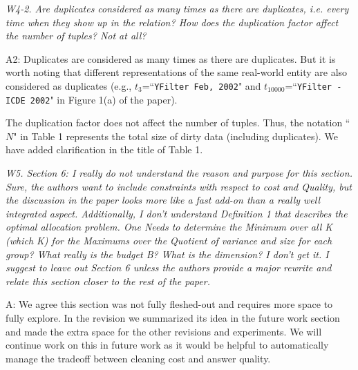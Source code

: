 


\vspace{1em}
 

\emph{W4-2. Are duplicates considered as many times as there are duplicates, i.e. every time when they show up in the relation? How does the duplication factor affect the number of tuples? Not at all?}


A2: Duplicates are considered as many times as there are duplicates. But it is worth noting that different representations of the same real-world entity are also considered as duplicates (e.g., $t_3$=``\texttt{YFilter Feb, 2002}" and $t_{10000}$=``\texttt{YFilter - ICDE 2002}" in Figure 1(a) of the paper). 

The duplication factor does not affect the number of tuples. Thus, the notation ``$N$" in Table 1 represents the total size of dirty data (including duplicates). We have added clarification in the title of Table 1.


\mbox{}

\emph{W5. Section 6: I really do not understand the reason and purpose for this section. Sure, the authors want to include constraints with respect to cost and Quality, but the discussion in the paper looks more like a fast add-on than a really well integrated aspect. Additionally, I don't understand Definition 1 that describes the optimal allocation problem. One Needs to determine the Minimum over all K (which K) for the Maximums over the Quotient of variance and size for each group? What really is the budget B? What is the dimension? I don't get it. I suggest to leave out Section 6 unless the authors provide a major rewrite and relate this section closer to the rest of the paper.}

A: We agree this section was not fully fleshed-out and requires more space to fully explore. In the revision we summarized its idea in the future work section and made the extra space for the other revisions and experiments.  We will continue
work on this in future work as it would be helpful to automatically manage the tradeoff between cleaning cost and answer quality.

